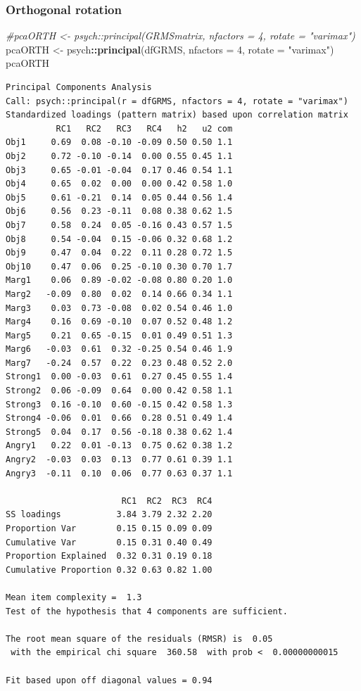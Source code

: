 \documentclass[
  english,
]{book}
\newenvironment{Shaded}{\begin{snugshade}}{\end{snugshade}}
\newcommand{\CommentTok}[1]{\textcolor[rgb]{0.56,0.35,0.01}{\textit{#1}}}
\newcommand{\DataTypeTok}[1]{\textcolor[rgb]{0.13,0.29,0.53}{#1}}
\newcommand{\DecValTok}[1]{\textcolor[rgb]{0.00,0.00,0.81}{#1}}
\newcommand{\KeywordTok}[1]{\textcolor[rgb]{0.13,0.29,0.53}{\textbf{#1}}}
\newcommand{\NormalTok}[1]{#1}
\newcommand{\OperatorTok}[1]{\textcolor[rgb]{0.81,0.36,0.00}{\textbf{#1}}}
\newcommand{\StringTok}[1]{\textcolor[rgb]{0.31,0.60,0.02}{#1}}
\begin{document}
\hypertarget{orthogonal-rotation}{%
\subsubsection{Orthogonal rotation}\label{orthogonal-rotation}}

\begin{Shaded}
\begin{Highlighting}[]
\CommentTok{#pcaORTH <- psych::principal(GRMSmatrix, nfactors = 4, rotate = "varimax")}
\NormalTok{pcaORTH <-}\StringTok{ }\NormalTok{psych}\OperatorTok{::}\KeywordTok{principal}\NormalTok{(dfGRMS, }\DataTypeTok{nfactors =} \DecValTok{4}\NormalTok{, }\DataTypeTok{rotate =} \StringTok{"varimax"}\NormalTok{)}
\NormalTok{pcaORTH}
\end{Highlighting}
\end{Shaded}

\begin{verbatim}
Principal Components Analysis
Call: psych::principal(r = dfGRMS, nfactors = 4, rotate = "varimax")
Standardized loadings (pattern matrix) based upon correlation matrix
          RC1   RC2   RC3   RC4   h2   u2 com
Obj1     0.69  0.08 -0.10 -0.09 0.50 0.50 1.1
Obj2     0.72 -0.10 -0.14  0.00 0.55 0.45 1.1
Obj3     0.65 -0.01 -0.04  0.17 0.46 0.54 1.1
Obj4     0.65  0.02  0.00  0.00 0.42 0.58 1.0
Obj5     0.61 -0.21  0.14  0.05 0.44 0.56 1.4
Obj6     0.56  0.23 -0.11  0.08 0.38 0.62 1.5
Obj7     0.58  0.24  0.05 -0.16 0.43 0.57 1.5
Obj8     0.54 -0.04  0.15 -0.06 0.32 0.68 1.2
Obj9     0.47  0.04  0.22  0.11 0.28 0.72 1.5
Obj10    0.47  0.06  0.25 -0.10 0.30 0.70 1.7
Marg1    0.06  0.89 -0.02 -0.08 0.80 0.20 1.0
Marg2   -0.09  0.80  0.02  0.14 0.66 0.34 1.1
Marg3    0.03  0.73 -0.08  0.02 0.54 0.46 1.0
Marg4    0.16  0.69 -0.10  0.07 0.52 0.48 1.2
Marg5    0.21  0.65 -0.15  0.01 0.49 0.51 1.3
Marg6   -0.03  0.61  0.32 -0.25 0.54 0.46 1.9
Marg7   -0.24  0.57  0.22  0.23 0.48 0.52 2.0
Strong1  0.00 -0.03  0.61  0.27 0.45 0.55 1.4
Strong2  0.06 -0.09  0.64  0.00 0.42 0.58 1.1
Strong3  0.16 -0.10  0.60 -0.15 0.42 0.58 1.3
Strong4 -0.06  0.01  0.66  0.28 0.51 0.49 1.4
Strong5  0.04  0.17  0.56 -0.18 0.38 0.62 1.4
Angry1   0.22  0.01 -0.13  0.75 0.62 0.38 1.2
Angry2  -0.03  0.03  0.13  0.77 0.61 0.39 1.1
Angry3  -0.11  0.10  0.06  0.77 0.63 0.37 1.1

                       RC1  RC2  RC3  RC4
SS loadings           3.84 3.79 2.32 2.20
Proportion Var        0.15 0.15 0.09 0.09
Cumulative Var        0.15 0.31 0.40 0.49
Proportion Explained  0.32 0.31 0.19 0.18
Cumulative Proportion 0.32 0.63 0.82 1.00

Mean item complexity =  1.3
Test of the hypothesis that 4 components are sufficient.

The root mean square of the residuals (RMSR) is  0.05 
 with the empirical chi square  360.58  with prob <  0.00000000015 

Fit based upon off diagonal values = 0.94
\end{verbatim}
\end{document}
